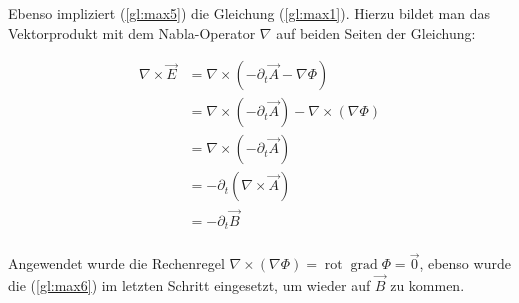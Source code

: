 Ebenso impliziert (\ref{gl:max5}) die Gleichung (\ref{gl:max1}). Hierzu bildet man das Vektorprodukt mit dem Nabla-Operator $\nabla$ auf beiden Seiten der Gleichung:

\begin{align*}
\nabla \times \vec{E} &= \nabla \times (-\partial_t\vec{A} - \nabla\Phi) \\
 &= \nabla \times (-\partial_t\vec{A}) - \nabla \times(\nabla\Phi) \\
 &= \nabla \times (-\partial_t\vec{A}) \\
 &= -\partial_t (\nabla \times \vec{A}) \\
 &= -\partial_t \vec{B} \\
\end{align*}

Angewendet wurde die Rechenregel $\nabla \times(\nabla\Phi) = \operatorname{rot}\operatorname{grad}\Phi = \vec{0} $, ebenso wurde die (\ref{gl:max6}) im letzten Schritt eingesetzt, um wieder auf $\vec{B}$ zu kommen.

